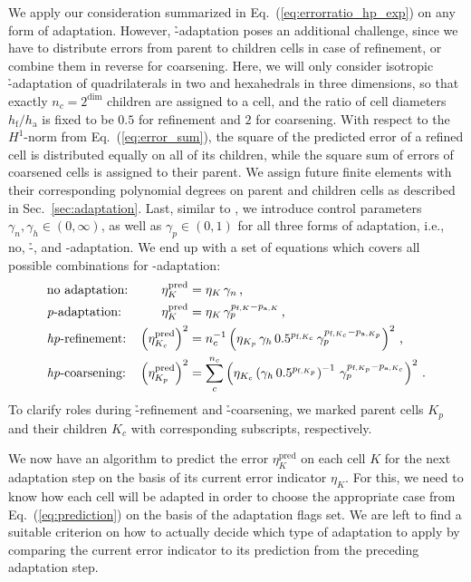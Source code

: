 We apply our consideration summarized in Eq.~(\ref{eq:errorratio_hp_exp}) on any form of adaptation. However, \h-adaptation poses an additional challenge, since we have to distribute errors from parent to children cells in case of refinement, or combine them in reverse for coarsening. Here, we will only consider isotropic \h-adaptation of quadrilaterals in two and hexahedrals in three dimensions, so that exactly $n_c = 2^\text{dim}$ children are assigned to a cell, and the ratio of cell diameters $h_\text{f} / h_\text{a}$ is fixed to be $0.5$ for refinement and $2$ for coarsening. With respect to the $H^1$-norm from Eq.~(\ref{eq:error_sum}), the square of the predicted error of a refined cell is distributed equally on all of its children, while the square sum of errors of coarsened cells is assigned to their parent. We assign future finite elements with their corresponding polynomial degrees on parent and children cells as described in Sec.~\ref{sec:adaptation}. Last, similar to \textcite{melenk2001}, we introduce control parameters $\gamma_n, \gamma_h \in (0, \infty)$, as well as $\gamma_p \in (0,1)$ for all three forms of adaptation, i.e., no, \h-, and \p-adaptation. We end up with a set of equations which covers all possible combinations for \hp-adaptation:
\begin{subequations}
\begin{align}
&\text{no adaptation:} & \eta^\text{pred}_K &= \eta_K \, \gamma_n \,\text{,} \\
&\text{\textit{p}-adaptation:} & \eta^\text{pred}_K &= \eta_K \, \gamma_p^{p_{\text{f},K} - p_{\text{a},K}} \,\text{,} \\
&\text{\textit{hp}-refinement:} & \left( \eta^\text{pred}_{K_c} \right)^2 &= n_c^{-1} \left( \eta_{K_p} \, \gamma_h \, 0.5^{p_{\text{f},K_c}} \, \gamma_p^{p_{\text{f},K_c} - p_{\text{a},K_p}} \right)^2 \,\text{,} \\
&\text{\textit{hp}-coarsening:} & \left( \eta^\text{pred}_{K_p} \right)^2 &= \sum\limits_c^{n_c} \left( \eta_{K_c} \left( \gamma_h \, 0.5^{p_{\text{f},K_p}} \right)^{-1} \, \gamma_p^{p_{\text{f},K_p} - p_{\text{a},K_c}} \right)^2 \,\text{.} 
\end{align}
\label{eq:prediction}
\end{subequations}
To clarify roles during \h-refinement and \h-coarsening, we marked parent cells $K_p$ and their children $K_c$ with corresponding subscripts, respectively.

We now have an algorithm to predict the error $\eta^\text{pred}_K$ on each cell $K$ for the next adaptation step on the basis of its current error indicator $\eta_K$. For this, we need to know how each cell will be adapted in order to choose the appropriate case from Eq.~(\ref{eq:prediction}) on the basis of the adaptation flags set. We are left to find a suitable criterion on how to actually decide which type of adaptation to apply by comparing the current error indicator to its prediction from the preceding adaptation step.

